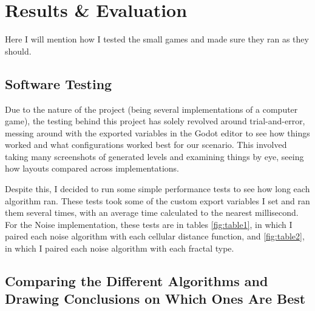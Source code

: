 \chapter{Results \& Evaluation} \label{Evaluation}

Here I will mention how I tested the small games and made sure they ran as they should.

\section{Software Testing}

Due to the nature of the project (being several implementations of a computer game), the testing behind this project has solely revolved around trial-and-error, messing around with the exported variables in the Godot editor to see how things worked and what configurations worked best for our scenario. This involved taking many screenshots of generated levels and examining things by eye, seeing how layouts compared across implementations.

Despite this, I decided to run some simple performance tests to see how long each algorithm ran. These tests took some of the custom export variables I set and ran them several times, with an average time calculated to the nearest millisecond. For the Noise implementation, these tests are in tables \ref{fig:table1}, in which I paired each noise algorithm with each cellular distance function, and \ref{fig:table2}, in which I paired each noise algorithm with each fractal type.

\section{Comparing the Different Algorithms and Drawing Conclusions on Which Ones Are Best}
